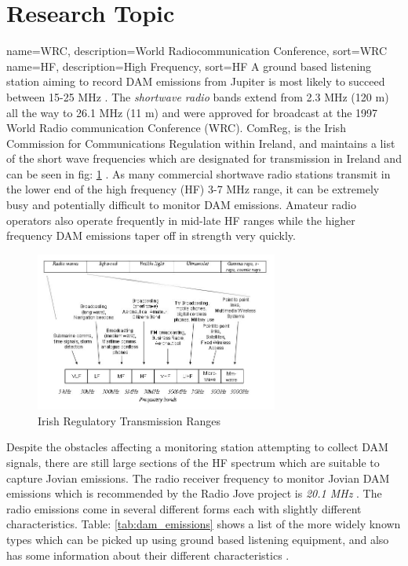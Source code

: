 \documentclass[runningheads,a4paper]{llncs}
\begin{document}
\section*{Research Topic}
%
%
{
  name={WRC},
  description={World Radiocommunication Conference},
  sort=WRC
}
{
  name={HF},
  description={High Frequency},
  sort=HF
}
%
A ground based listening station aiming to record \gls{DAM} emissions from Jupiter is most likely to succeed between 15-25 MHz \citep{wilkinson94}. The \textit{shortwave radio} bands extend from 2.3 MHz (120 m) all the way to 26.1 MHz (11 m) and were approved for broadcast at the 1997 World Radio communication Conference (\gls{WRC}). ComReg, is the Irish Commission for Communications Regulation within Ireland, and maintains a list of the short wave frequencies which are designated for transmission in Ireland and can be seen in fig: \ref{fig:irish_electromagnetic_transmission_ranges} \citep{comreg14}. As many commercial shortwave radio stations transmit in the lower end of the high frequency (\gls{HF}) 3-7 MHz range, it can be extremely busy and potentially difficult to monitor \gls{DAM} emissions. Amateur radio operators also operate frequently in mid-late \gls{HF} ranges while the higher frequency \gls{DAM} emissions taper off in strength very quickly.
%
\begin{figure}[here]
\centering
\includegraphics[width=8cm]{images/06}
\caption{Irish Regulatory Transmission Ranges \citep{comreg14}}
\label{fig:irish_electromagnetic_transmission_ranges}
\end{figure}
%
Despite the obstacles affecting a monitoring station attempting to collect \gls{DAM} signals, there are still large sections of the \gls{HF} spectrum which are suitable to capture Jovian emissions. The radio receiver frequency to monitor Jovian \gls{DAM} emissions which is recommended by the Radio Jove project is \textit{20.1 MHz} \citep{nasa12}. The radio emissions come in several different forms each with slightly different characteristics. Table: \ref{tab:dam_emissions} shows a list of the more widely known types which can be picked up using ground based listening equipment, and also has some information about their different characteristics \citep{wilkinson94}.
\end{document}
